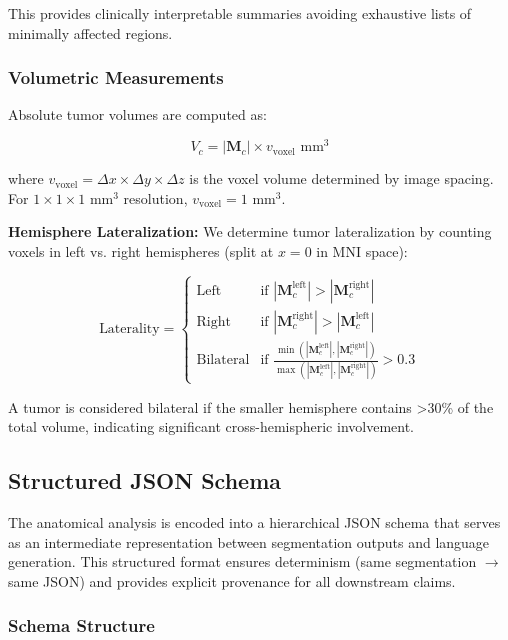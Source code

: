 \documentclass[conference]{IEEEtran}
\begin{document}
This provides clinically interpretable summaries avoiding exhaustive lists of minimally affected regions.

\subsubsection{Volumetric Measurements}

Absolute tumor volumes are computed as:

\begin{equation}
V_c = |\mathbf{M}_c| \times v_{\text{voxel}} \text{ mm}^3
\end{equation}

where $v_{\text{voxel}} = \Delta x \times \Delta y \times \Delta z$ is the voxel volume determined by image spacing. For $1 \times 1 \times 1$ mm$^3$ resolution, $v_{\text{voxel}} = 1$ mm$^3$.

\textbf{Hemisphere Lateralization:} We determine tumor lateralization by counting voxels in left vs. right hemispheres (split at $x=0$ in MNI space):

\begin{equation}
\text{Laterality} = \begin{cases}
\text{Left} & \text{if } |\mathbf{M}_c^{\text{left}}| > |\mathbf{M}_c^{\text{right}}| \\
\text{Right} & \text{if } |\mathbf{M}_c^{\text{right}}| > |\mathbf{M}_c^{\text{left}}| \\
\text{Bilateral} & \text{if } \frac{\min(|\mathbf{M}_c^{\text{left}}|, |\mathbf{M}_c^{\text{right}}|)}{\max(|\mathbf{M}_c^{\text{left}}|, |\mathbf{M}_c^{\text{right}}|)} > 0.3
\end{cases}
\end{equation}

A tumor is considered bilateral if the smaller hemisphere contains >30\% of the total volume, indicating significant cross-hemispheric involvement.

\subsection{Structured JSON Schema}

The anatomical analysis is encoded into a hierarchical JSON schema that serves as an intermediate representation between segmentation outputs and language generation. This structured format ensures determinism (same segmentation $\to$ same JSON) and provides explicit provenance for all downstream claims.

\subsubsection{Schema Structure}
\end{document}
